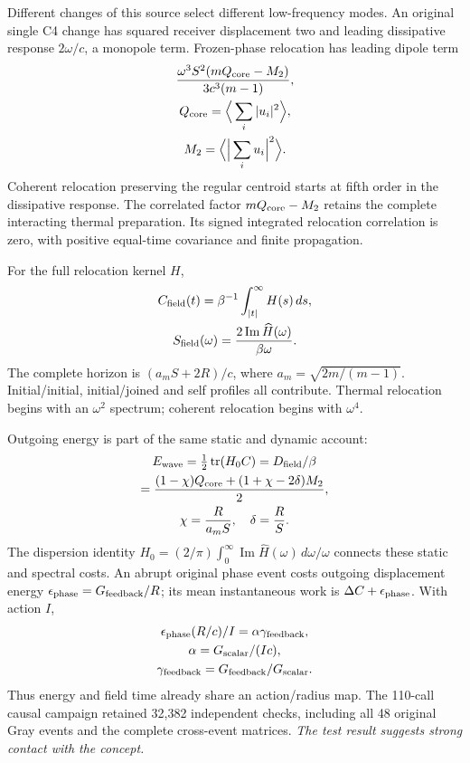 Different changes of this source select different low-frequency modes.
An original single C4 change has squared receiver displacement two and
leading dissipative response \(2\omega/c\), a monopole term. Frozen-phase
relocation has leading dipole term
\[
\begin{gathered}
\frac{\omega^3S^2(mQ_{\rm core}-M_2)}{3c^3(m-1)},\\
 Q_{\rm core}=\Big\langle\sum_i|u_i|^2\Big\rangle,\\
 M_2=\Big\langle\Big|\sum_i u_i\Big|^2\Big\rangle.
\end{gathered}
\]
Coherent relocation preserving the regular centroid starts at fifth
order in the dissipative response. The correlated factor \(mQ_{\rm core}-M_2\)
retains the complete interacting thermal preparation. Its signed
integrated relocation correlation is zero, with positive equal-time
covariance and finite propagation.

For the full relocation kernel \(H\),
\[
\begin{gathered}
C_{\rm field}(t)=\beta^{-1}\int_{|t|}^{\infty}H(s)\,ds,\\
 S_{\rm field}(\omega)=\frac{2\operatorname{Im}\widehat H(\omega)}
                            {\beta\omega}.
\end{gathered}
\]
The complete horizon is \((a_mS+2R)/c\), where
\(a_m=\sqrt{2m/(m-1)}\). Initial/initial, initial/joined and self profiles
all contribute. Thermal relocation begins with an \(\omega^2\) spectrum;
coherent relocation begins with \(\omega^4\).

Outgoing energy is part of the same static and dynamic account:
\[
\begin{gathered}
E_{\rm wave}=\tfrac12\operatorname{tr}(H_0C)
 =D_{\rm field}/\beta\\
 =\frac{(1-\chi)Q_{\rm core}+(1+\chi-2\delta)M_2}{2},\\
 \chi=\frac{R}{a_mS},\quad\delta=\frac RS.
\end{gathered}
\]
The dispersion identity
\(H_0=(2/\pi)\int_0^\infty\operatorname{Im}\widehat H(\omega)
\,d\omega/\omega\) connects these static and spectral costs.
An abrupt original phase event costs outgoing displacement energy
\(\epsilon_{\rm phase}=G_{\rm feedback}/R\); its mean instantaneous work
is \(\Delta C+\epsilon_{\rm phase}\). With action \(I\),
\[
\begin{gathered}
\epsilon_{\rm phase}(R/c)/I=\alpha\gamma_{\rm feedback},\\
 \alpha=G_{\rm scalar}/(Ic),\\
 \gamma_{\rm feedback}=G_{\rm feedback}/G_{\rm scalar}.
\end{gathered}
\]
Thus energy and field time already share an action/radius map.
The 110-call causal campaign retained 32,382 independent checks, including
all 48 original Gray events and the complete cross-event matrices.
\emph{The test result suggests strong contact with the concept.}

